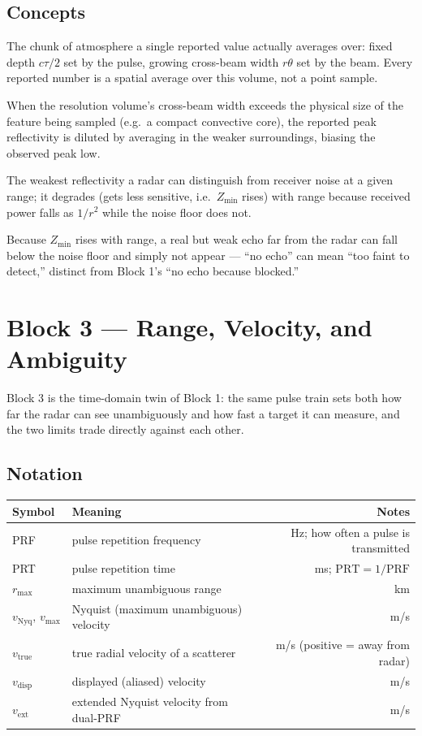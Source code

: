 \documentclass[11pt]{article}
\begin{document}
\subsection{Concepts}
\begin{description}[leftmargin=1.6cm,style=nextline]
\item[Resolution volume] The chunk of atmosphere a single reported value actually averages over: fixed depth $c\tau/2$ set by the pulse, growing cross-beam width $r\theta$ set by the beam. Every reported number is a spatial average over this volume, not a point sample.
\item[Beam filling] When the resolution volume's cross-beam width exceeds the physical size of the feature being sampled (e.g.\ a compact convective core), the reported peak reflectivity is diluted by averaging in the weaker surroundings, biasing the observed peak low.
\item[Minimum detectable signal (sensitivity)] The weakest reflectivity a radar can distinguish from receiver noise at a given range; it degrades (gets less sensitive, i.e.\ $Z_{\min}$ rises) with range because received power falls as $1/r^2$ while the noise floor does not.
\item[Detection vs.\ absence] Because $Z_{\min}$ rises with range, a real but weak echo far from the radar can fall below the noise floor and simply not appear --- ``no echo'' can mean ``too faint to detect,'' distinct from Block 1's ``no echo because blocked.''
\end{description}

\section{Block 3 --- Range, Velocity, and Ambiguity}

Block 3 is the time-domain twin of Block 1: the same pulse train sets both how far the radar can see unambiguously and how fast a target it can measure, and the two limits trade directly against each other.

\subsection{Notation}
\begin{longtable}{L M N}
\toprule
Symbol & Meaning & Notes \\
\midrule
\endhead
PRF & pulse repetition frequency & Hz; how often a pulse is transmitted \\
PRT & pulse repetition time & ms; $\mathrm{PRT} = 1/\mathrm{PRF}$ \\
$r_{\max}$ & maximum unambiguous range & km \\
$v_{\mathrm{Nyq}},\,v_{\max}$ & Nyquist (maximum unambiguous) velocity & m/s \\
$v_{\mathrm{true}}$ & true radial velocity of a scatterer & m/s (positive = away from radar) \\
$v_{\mathrm{disp}}$ & displayed (aliased) velocity & m/s \\
$v_{\mathrm{ext}}$ & extended Nyquist velocity from dual-PRF & m/s \\
\bottomrule
\end{longtable}
\end{document}

